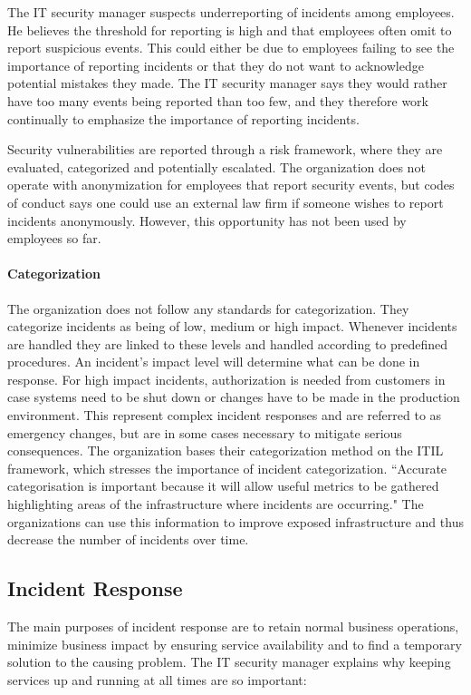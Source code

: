 The IT security manager suspects underreporting of incidents among employees. He believes the threshold for reporting is high and that employees often omit to report suspicious events. This could either be due to employees failing to see the importance of reporting incidents or that they do not want to acknowledge potential mistakes they made. The IT security manager says they would rather have too many events being reported than too few, and they therefore work continually to emphasize the importance of reporting incidents.

Security vulnerabilities are reported through a risk framework, where they are evaluated, categorized and potentially escalated. The organization does not operate with anonymization for employees that report security events, but codes of conduct says one could use an external law firm if someone wishes to report incidents anonymously. However, this opportunity has not been used by employees so far. 

\paragraph{Categorization}
The organization does not follow any standards for categorization. They categorize incidents as being of low, medium or high impact. Whenever incidents are handled they are linked to these levels and handled according to predefined procedures. An incident's impact level will determine what can be done in response. For high impact incidents, authorization is needed from customers in case systems need to be shut down or changes have to be made in the production environment. This represent complex incident responses and are referred to as emergency changes, but are in some cases necessary to mitigate serious consequences. 
The organization bases their categorization method on the ITIL framework, which stresses the importance of incident categorization. ``Accurate categorisation is important because it will allow useful metrics to be gathered highlighting areas of the infrastructure where incidents are occurring\cite{itilbok}." The organizations can use this information to improve exposed infrastructure and thus decrease the number of incidents over time.

\subsection{Incident Response}
The main purposes of incident response are to retain normal business operations, minimize business impact by ensuring service availability and to find a temporary solution to the causing problem. The IT security manager explains why keeping services up and running at all times are so important:

